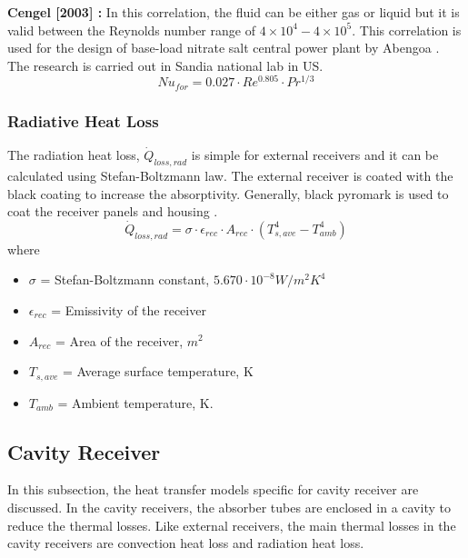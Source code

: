 \noindent \textbf{{Cengel [2003] \cite{Cengel.2003}:}}
In this correlation, the fluid can be either gas or liquid but it is valid between the Reynolds number range of $4 \times 10^4 - 4 \times 10^5$. This correlation is used for the design of base-load nitrate salt central power plant by Abengoa \cite{Tilley.2014}. The research is carried out in Sandia national lab in US.\\
\begin{equation} 
Nu_{for}=0.027\cdot Re^{0.805}\cdot Pr^{1/3}
\end{equation}
\subsubsection{Radiative Heat Loss}
The radiation heat loss, $\dot Q_{loss,rad}$ is simple for external receivers and it can be calculated using Stefan-Boltzmann law. The external receiver is coated with the black coating to increase the absorptivity. Generally, black pyromark is used to coat the receiver panels and housing \cite{Zavoico.2001}.
\begin{equation}
\dot Q_{loss,rad}=\sigma \cdot \epsilon_{rec}\cdot A_{rec}\cdot (T_{s,ave}^4-T_{amb}^4)
\end{equation}
where  
\begin{itemize}
	\item $\sigma$ = Stefan-Boltzmann constant, $ 5.670 \cdot 10^{-8} W / m^2 K^4$ 
	\item $\epsilon_{rec}$ = Emissivity of the receiver
	\item $A_{rec}$ = Area of the receiver, $m^2$
	\item $T_{s,ave}$ = Average surface temperature, K
	\item $T_{amb}$ = Ambient temperature, K.
\end{itemize}
\subsection{Cavity Receiver}
In this subsection, the heat transfer models specific for cavity receiver are discussed. In the cavity receivers, the absorber tubes are enclosed in a cavity to reduce the thermal losses. Like external receivers, the main thermal losses in the cavity receivers are convection heat loss and radiation heat loss.
